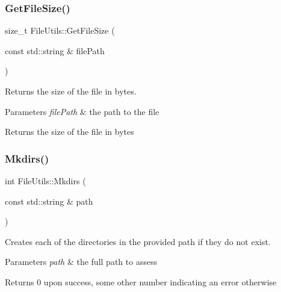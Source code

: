 \subsubsection{\texorpdfstring{Get\+File\+Size()}{GetFileSize()}}
{\footnotesize\ttfamily size\+\_\+t File\+Utils\+::\+Get\+File\+Size (\begin{DoxyParamCaption}\item[{const std\+::string \&}]{file\+Path }\end{DoxyParamCaption})\hspace{0.3cm}{\ttfamily [static]}}



Returns the size of the file in bytes. 


\begin{DoxyParams}{Parameters}
{\em file\+Path} & the path to the file \\
\hline
\end{DoxyParams}
\begin{DoxyReturn}{Returns}
the size of the file in bytes 
\end{DoxyReturn}
\mbox{\label{class_aws_1_1_iot_1_1_device_client_1_1_util_1_1_file_utils_acec1cd53ec38fcb34606141443dec4fe}} 
\subsubsection{\texorpdfstring{Mkdirs()}{Mkdirs()}}
{\footnotesize\ttfamily int File\+Utils\+::\+Mkdirs (\begin{DoxyParamCaption}\item[{const std\+::string \&}]{path }\end{DoxyParamCaption})\hspace{0.3cm}{\ttfamily [static]}}



Creates each of the directories in the provided path if they do not exist. 


\begin{DoxyParams}{Parameters}
{\em path} & the full path to assess \\
\hline
\end{DoxyParams}
\begin{DoxyReturn}{Returns}
0 upon success, some other number indicating an error otherwise 
\end{DoxyReturn}
\mbox{\label{class_aws_1_1_iot_1_1_device_client_1_1_util_1_1_file_utils_af165bb643fa6c8aa0d6beace43275dcd}} 
